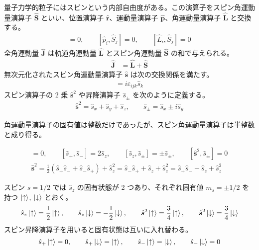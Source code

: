\documentclass[uplatex,dvipdfmx,a4paper,11pt]{jlreq}
\newcommand{\rr}{\bm{r}}
\newcommand{\pp}{\bm{p}}
\theoremstyle{definition}
\begin{document}
\begin{definition}[スピン角運動量]
  量子力学的粒子にはスピンという内部自由度がある。この演算子をスピン角運動量演算子 $\hat{\bm{S}}$ といい、位置演算子 $\hat{\rr}$、運動量演算子 $\hat{\pp}$、角運動量演算子 $\hat{\bm{L}}$ と交換する。
  \begin{align}
    [\hat{r}_i, \hat{S}_j] = 0, \qquad [\hat{p}_i, \hat{S}_j] = 0, \qquad [\hat{L}_i, \hat{S}_j] = 0
  \end{align}
  全角運動量 $\hat{\bm{J}}$ は軌道角運動量 $\hat{\bm{L}}$ とスピン角運動量 $\hat{\bm{S}}$ の和で与えられる。
  \begin{align}
    \hat{\bm{J}} & = \hat{\bm{L}} + \hat{\bm{S}}
  \end{align}
  無次元化されたスピン角運動量演算子 $\hat{\bm{s}}$ は次の交換関係を満たす。
  \begin{align}
    [\hat{s}_i, \hat{s}_j] = i\varepsilon_{ijk}\hat{s}_k
  \end{align}
  スピン演算子の 2 乗 $\hat{\bm{s}}^2$ や昇降演算子 $\hat{s}_\pm$ を次のように定義する。
  \begin{align}
    \hat{\bm{s}}^2 = \hat{s}_x + \hat{s}_y + \hat{s}_z, \qquad \hat{s}_\pm = \hat{s}_x \pm i\hat{s}_y
  \end{align}
\end{definition}
角運動量演算子の固有値は整数だけであったが、スピン角運動量演算子は半整数と成り得る。

\begin{proposition}
  \begin{align}
    [\hat{\bm{s}}^2, \hat{s}_z] = 0, \qquad [\hat{s}_+, \hat{s}_-] = 2\hat{s}_z, \qquad [\hat{s}_z, \hat{s}_\pm] = \pm \hat{s}_\pm, \qquad [\hat{\bm{s}}^2, \hat{s}_\pm] = 0 \\
    \hat{\bm{s}}^2 = \frac{1}{2}(\hat{s}_+\hat{s}_- + \hat{s}_-\hat{s}_+) + \hat{s}_z^2 = \hat{s}_-\hat{s}_+ + \hat{s}_z + \hat{s}_z^2 = \hat{s}_+\hat{s}_- - \hat{s}_z + \hat{s}_z^2
  \end{align}
\end{proposition}

\begin{proposition}
  スピン $s = 1/2$ では $\hat{s}_z$ の固有状態が 2 つあり、それぞれ固有値 $m_s = \pm1/2$ を持つ $\ket{\uparrow}$, $\ket{\downarrow}$ とおく。
  \begin{align}
    \hat{s}_z\ket{\uparrow} = \frac{1}{2}\ket{\uparrow}, \qquad \hat{s}_z\ket{\downarrow} = -\frac{1}{2}\ket{\downarrow}, \qquad \hat{\bm{s}}^2\ket{\uparrow} = \frac{3}{4}\ket{\uparrow}, \qquad \hat{\bm{s}}^2\ket{\downarrow} = \frac{3}{4}\ket{\downarrow}
  \end{align}
  スピン昇降演算子を用いると固有状態は互いに入れ替わる。
  \begin{align}
    \hat{s}_+\ket{\uparrow} = 0, \qquad \hat{s}_+\ket{\downarrow} = \ket{\uparrow}, \qquad \hat{s}_-\ket{\uparrow} = \ket{\downarrow}, \qquad \hat{s}_-\ket{\downarrow} = 0
  \end{align}
\end{proposition}
\end{document}
